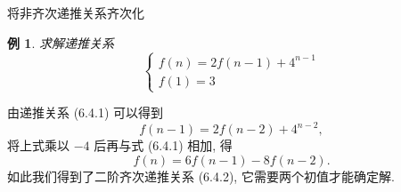 \documentclass[punct]{ctexbeamer}
\newtheorem{ex}{例}[section]
\def\sol{\noindent {\bf 解\ }}
\begin{document}
%

\begin{frame}{将非齐次递推关系齐次化}
	\begin{ex}
		求解递推关系
		$$
		\left\{\begin{array}{l}
			f(n)=2 f(n-1)+4^{n-1} \\
			f(1)=3
		\end{array}\right.
		$$
	\end{ex}
\pause\sol
由递推关系 (6.4.1) 可以得到
$$
f(n-1)=2 f(n-2)+4^{n-2},
$$
将上式乘以 $-4$ 后再与式 (6.4.1) 相加, 得
\[
f(n)=6 f(n-1)-8 f(n-2)\tag{6.4.2} .
\]
如此我们得到了二阶齐次递推关系 (6.4.2), 它需要两个初值才能确定解.
\end{frame}
\end{document}
